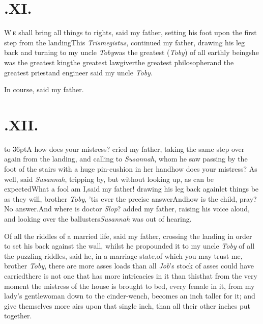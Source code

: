 \documentclass{article}
\begin{document}
\newpage
\null\smallskip
\section{.\enspace XI.}

\lettrine{W}{\,e} shall bring all things to rights, said my father, setting his foot upon
the first step from the landing\tsh This \textit{Trismegistus}, continued my father,
drawing his leg back and turning to my uncle \textit{Toby}\tsk was the greatest
(\textit{Toby}) of all earthly beings\tsk he was the greatest king\tsk the greatest
lawgiver\tsk the greatest philosopher\tsk and the greatest
priest\tsh and engineer\tsk
said my uncle \textit{Toby}.\tsk

\tsk In course, said my father.

\vfill


\newpage
\section{.\enspace XII.}

\lettrine{\hbox to 36pt{\hskip -3pt\Tsk A}}{} how does your mistress?\break
cried my father, taking the\break
same step over again from the landing, and calling to
\textit{Susannah}, whom he saw passing by the foot of the
stairs with a huge pin-cushion in her hand\tsk how does your
mistress? As well, said \textit{Susannah}, tripping by, but
without looking up, as can be expected\tsk What a fool am
I,\break said my father! drawing his leg back again\tsk let things
be as they will, brother \textit{Toby}, ’tis ever the
precise answer\tsk And\break how is the child, pray?\tsk No
answer.\break And where is doctor \textit{Slop}?  added my
father, raising his voice aloud, and looking over the
ballusters\tsk \textit{Susannah} was out of hearing.

Of all the riddles of a married life, said my father, crossing the landing in order
to set his back against the wall, whilst he propounded it to my uncle \textit{Toby}
\tsk of all the puzzling riddles, said he, in a marriage state,\tsk of which you may
trust me, brother \textit{Toby}, there are more asses loads than all \textit{Job}’s
stock of asses could have carried\tsk there is not one that has more intricacies in
it than this\tsk that from the very moment the mistress of the house is brought to
bed, every female in it, from my lady’s gentlewoman down to the cinder-wench,
becomes an inch taller for it; and give themselves more airs upon that single inch,
than all their other inches put together.
\end{document}
